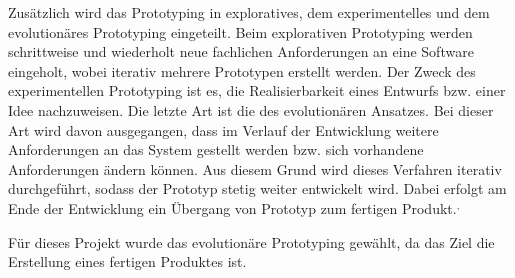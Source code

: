 Zusätzlich wird das Prototyping in exploratives, dem experimentelles und dem evolutionäres Prototyping eingeteilt.
Beim explorativen Prototyping werden schrittweise und wiederholt neue fachlichen Anforderungen an eine Software eingeholt, wobei iterativ mehrere Prototypen erstellt werden. 
Der Zweck des experimentellen Prototyping ist es, die Realisierbarkeit eines Entwurfs bzw. einer Idee nachzuweisen.
Die letzte Art ist die des evolutionären Ansatzes. 
Bei dieser Art wird davon ausgegangen, dass im Verlauf der Entwicklung weitere Anforderungen an das System gestellt werden bzw. sich vorhandene Anforderungen ändern können. 
Aus diesem Grund wird dieses Verfahren iterativ durchgeführt, sodass der Prototyp stetig weiter entwickelt wird. 
Dabei erfolgt am Ende der Entwicklung ein Übergang von Prototyp zum fertigen Produkt.\autocite[Vgl.][S. 370]{MS-Alpar.2019}$^,$\autocite[Vgl.][S. 6-12]{MS-Floyd.1984} 

Für dieses Projekt wurde das evolutionäre Prototyping gewählt, da das Ziel die Erstellung eines fertigen Produktes ist.